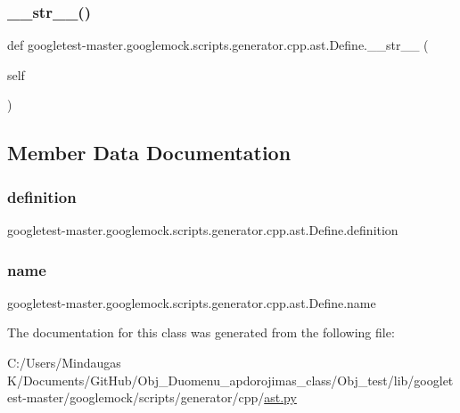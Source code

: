 \subsubsection{\texorpdfstring{\_\_str\_\_()}{\_\_str\_\_()}}
{\footnotesize\ttfamily def googletest-\/master.\+googlemock.\+scripts.\+generator.\+cpp.\+ast.\+Define.\+\_\+\+\_\+str\+\_\+\+\_\+ (\begin{DoxyParamCaption}\item[{}]{self }\end{DoxyParamCaption})}



\subsection{Member Data Documentation}
\mbox{\label{classgoogletest-master_1_1googlemock_1_1scripts_1_1generator_1_1cpp_1_1ast_1_1_define_a1f17682a1ffde329aad92f58c614c1c1}} 
\subsubsection{\texorpdfstring{definition}{definition}}
{\footnotesize\ttfamily googletest-\/master.\+googlemock.\+scripts.\+generator.\+cpp.\+ast.\+Define.\+definition}

\mbox{\label{classgoogletest-master_1_1googlemock_1_1scripts_1_1generator_1_1cpp_1_1ast_1_1_define_a3ca9bb2d2c18a51f45b8d48221f09625}} 
\subsubsection{\texorpdfstring{name}{name}}
{\footnotesize\ttfamily googletest-\/master.\+googlemock.\+scripts.\+generator.\+cpp.\+ast.\+Define.\+name}



The documentation for this class was generated from the following file\+:\begin{DoxyCompactItemize}
\item 
C\+:/\+Users/\+Mindaugas K/\+Documents/\+Git\+Hub/\+Obj\+\_\+\+Duomenu\+\_\+apdorojimas\+\_\+class/\+Obj\+\_\+test/lib/googletest-\/master/googlemock/scripts/generator/cpp/\mbox{\hyperlink{_obj__test_2lib_2googletest-master_2googlemock_2scripts_2generator_2cpp_2ast_8py}{ast.\+py}}\end{DoxyCompactItemize}
